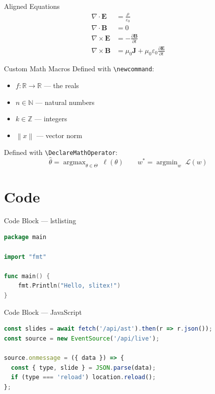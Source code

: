 \documentclass[aspectratio=169]{beamer}
\newcommand{\R}{\mathbb{R}}
\newcommand{\N}{\mathbb{N}}
\newcommand{\Z}{\mathbb{Z}}
\newcommand{\norm}[1]{\left\lVert #1 \right\rVert}
\DeclareMathOperator{\argmax}{argmax}
\DeclareMathOperator*{\argmin}{argmin}
\begin{document}
\begin{frame}{Aligned Equations}
  \begin{align}
    \nabla \cdot \mathbf{E}  &= \frac{\rho}{\varepsilon_0}     \\
    \nabla \cdot \mathbf{B}  &= 0                               \\
    \nabla \times \mathbf{E} &= -\frac{\partial \mathbf{B}}{\partial t} \\
    \nabla \times \mathbf{B} &= \mu_0 \mathbf{J} + \mu_0 \varepsilon_0 \frac{\partial \mathbf{E}}{\partial t}
  \end{align}
\end{frame}

\begin{frame}{Custom Math Macros}
  Defined with \texttt{\textbackslash newcommand}:

  \begin{itemize}
    \item $f : \R \to \R$ — the reals
    \item $n \in \N$ — natural numbers
    \item $k \in \Z$ — integers
    \item $\norm{x}$ — vector norm
  \end{itemize}

  \bigskip

  Defined with \texttt{\textbackslash DeclareMathOperator}:
  \[
    \hat{\theta} = \argmax_{\theta \in \Theta} \; \ell(\theta)
    \qquad
    w^* = \argmin_{w} \; \mathcal{L}(w)
  \]
\end{frame}

\section{Code}

\begin{frame}[fragile]{Code Block — lstlisting}
  \begin{lstlisting}[language=Go]
package main

import "fmt"

func main() {
    fmt.Println("Hello, slitex!")
}
  \end{lstlisting}
\end{frame}

\begin{frame}[fragile]{Code Block — JavaScript}
  \begin{lstlisting}[language=JavaScript]
const slides = await fetch('/api/ast').then(r => r.json());
const source = new EventSource('/api/live');

source.onmessage = ({ data }) => {
  const { type, slide } = JSON.parse(data);
  if (type === 'reload') location.reload();
};
  \end{lstlisting}
\end{frame}
\end{document}
